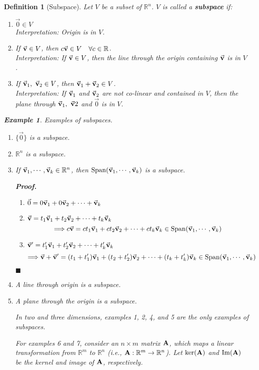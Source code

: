 \documentclass[12pt, a4paper]{article}
\newtheorem{df}{Definition}[subsection]
\newtheorem{eg}{Example}[subsection]
\newenvironment*{prf}{\par\indent\textbf{\textit{Proof. }}}{\hfill $\blacksquare$\par}
\def\R{{\mathbb{R}}}
\def\IM{{\mathrm{Im}}}
\def\Span{\mathrm{Span}}
\def\vecv{\va{v}}
\def\matrixA{\vb{A}}
\begin{document}
\begin{df}[Subspace]
	Let $V$ be a subset of $\R^n$. $V$ is called	 a \textbf{subspace} if: 
	\begin{enumerate}
		\item $\vec{0}\in V$\\
		Interpretation: Origin is in $V$.
		\item If $\vecv\in V$, then $c\vecv\in V\quad\forall c\in\R$.\\
		Interpretation: If $\vecv\in V$, then the line through the origin containing $\vecv$ is in $V$.
		\item If $\vecv_1,\ \vecv_2\in V$, then $\vecv_1+\vecv_2\in V$.\\
		Interpretation: If $\vecv_1$ and $\vecv_2$ are not co-linear and contained in $V$, then the plane through $\vecv_1,\ \vecv2$ and $\vec{0}$ is in $V$. 
	\end{enumerate}
	\begin{eg}
	Examples of subspaces. 
	\begin{enumerate}
		\item $\{\vec{0}\}$ is a subspace.
		\item $\R^n$ is a subspace.
		\item If $\vecv_1,\cdots,\vecv_k\in\R^n$, then $\Span(\vecv_1,\cdots,\vecv_k)$ is a subspace. \\
		\begin{prf}
			\begin{enumerate}
				\item $\vec{0}=0\vecv_1+0\vecv_2+\cdots+\vecv_k$
				\item $\vecv=t_1\vecv_1+t_2\vecv_2+\cdots+t_k\vecv_k$\[\Longrightarrow c\vecv=ct_1\vecv_1+ct_2\vecv_2+\cdots+ct_k\vecv_k\in\Span(\vecv_1,\cdots,\vecv_k)\]
				\item $\vecv'=t_1'\vecv_1+t_2'\vecv_2+\cdots+t_k'\vecv_k$\[\Longrightarrow \vecv+\vecv'=(t_1+t_1')\vecv_1+(t_2+t_2')\vecv_2+\cdots+(t_k+t_k')\vecv_k\in\Span(\vecv_1,\cdots,\vecv_k)\]
			\end{enumerate}	
		\end{prf}
		\item A line through origin is a subspace.
		\item A plane through the origin is a subspace.
		\begin{framed}
			In two and three dimensions, examples 1, 2, 4, and 5 are the only examples of subspaces.	
		\end{framed}
		For examples 6 and 7, consider an $n\times m$ matrix $\matrixA$, which maps a linear transformation from $\R^m$ to $\R^n$ (i.e., $\matrixA:\R^m\to\R^n$). Let $\ker(\matrixA)$ and $\IM(\matrixA)$ be the kernel and image of $\matrixA$, respectively. 

\end{enumerate}
\end{eg}
\end{df}
\end{document}
